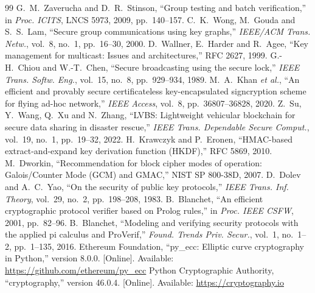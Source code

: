 \begin{thebibliography}{99}
 G.~M.~Zaverucha and D.~R.~Stinson, ``Group testing and batch verification,'' in \emph{Proc. ICITS}, LNCS 5973, 2009, pp.~140--157.
 C.~K.~Wong, M.~Gouda and S.~S.~Lam, ``Secure group communications using key graphs,'' \emph{IEEE/ACM Trans. Netw.}, vol.~8, no.~1, pp.~16--30, 2000.
 D.~Wallner, E.~Harder and R.~Agee, ``Key management for multicast: Issues and architectures,'' RFC 2627, 1999.
 G.-H.~Chiou and W.-T.~Chen, ``Secure broadcasting using the secure lock,'' \emph{IEEE Trans. Softw. Eng.}, vol.~15, no.~8, pp.~929--934, 1989.
 M.~A.~Khan \textit{et al.}, ``An efficient and provably secure certificateless key-encapsulated signcryption scheme for flying ad-hoc network,''
  \emph{IEEE Access}, vol.~8, pp.~36807--36828, 2020.
 Z.~Su, Y.~Wang, Q.~Xu and N.~Zhang, ``LVBS: Lightweight vehicular blockchain for secure data sharing in disaster rescue,''
  \emph{IEEE Trans. Dependable Secure Comput.}, vol.~19, no.~1, pp.~19--32, 2022.
 H.~Krawczyk and P.~Eronen, ``HMAC-based extract-and-expand key derivation function (HKDF),'' RFC 5869, 2010.
 M.~Dworkin, ``Recommendation for block cipher modes of operation: Galois/Counter Mode (GCM) and GMAC,'' NIST SP 800-38D, 2007.
 D.~Dolev and A.~C.~Yao, ``On the security of public key protocols,'' \emph{IEEE Trans. Inf. Theory}, vol.~29, no.~2, pp.~198--208, 1983.
 B.~Blanchet, ``An efficient cryptographic protocol verifier based on Prolog rules,'' in \emph{Proc. IEEE CSFW}, 2001, pp.~82--96.
 B.~Blanchet, ``Modeling and verifying security protocols with the applied pi calculus and ProVerif,''
  \emph{Found. Trends Priv. Secur.}, vol.~1, no.~1--2, pp.~1--135, 2016.
 Ethereum Foundation, ``py\_ecc: Elliptic curve cryptography in Python,'' version 8.0.0. [Online]. Available: \url{https://github.com/ethereum/py_ecc}
 Python Cryptographic Authority, ``cryptography,'' version 46.0.4. [Online]. Available: \url{https://cryptography.io}
\end{thebibliography}
